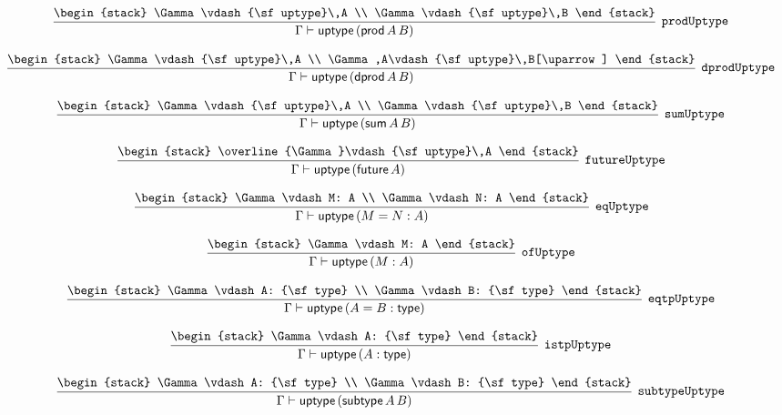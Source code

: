 \[
\infer[{\tt prodUptype}]{\Gamma \vdash {\sf uptype}\,({\sf prod}\,A\,B)}{
\begin{stack}
\Gamma \vdash {\sf uptype}\,A
\\
\Gamma \vdash {\sf uptype}\,B
\end{stack}}
\]

\[
\infer[{\tt dprodUptype}]{\Gamma \vdash {\sf uptype}\,({\sf dprod}\,A\,B)}{
\begin{stack}
\Gamma \vdash {\sf uptype}\,A
\\
\Gamma ,A\vdash {\sf uptype}\,B[\uparrow ]
\end{stack}}
\]

\[
\infer[{\tt sumUptype}]{\Gamma \vdash {\sf uptype}\,({\sf sum}\,A\,B)}{
\begin{stack}
\Gamma \vdash {\sf uptype}\,A
\\
\Gamma \vdash {\sf uptype}\,B
\end{stack}}
\]

\[
\infer[{\tt futureUptype}]{\Gamma \vdash {\sf uptype}\,({\sf future}\,A)}{
\begin{stack}
\overline{\Gamma}\vdash {\sf uptype}\,A
\end{stack}}
\]

\[
\infer[{\tt eqUptype}]{\Gamma \vdash {\sf uptype}\,(M= N: A)}{
\begin{stack}
\Gamma \vdash M: A
\\
\Gamma \vdash N: A
\end{stack}}
\]

\[
\infer[{\tt ofUptype}]{\Gamma \vdash {\sf uptype}\,(M: A)}{
\begin{stack}
\Gamma \vdash M: A
\end{stack}}
\]

\[
\infer[{\tt eqtpUptype}]{\Gamma \vdash {\sf uptype}\,(A= B: {\sf type})}{
\begin{stack}
\Gamma \vdash A: {\sf type}
\\
\Gamma \vdash B: {\sf type}
\end{stack}}
\]

\[
\infer[{\tt istpUptype}]{\Gamma \vdash {\sf uptype}\,(A: {\sf type})}{
\begin{stack}
\Gamma \vdash A: {\sf type}
\end{stack}}
\]

\[
\infer[{\tt subtypeUptype}]{\Gamma \vdash {\sf uptype}\,({\sf subtype}\,A\,B)}{
\begin{stack}
\Gamma \vdash A: {\sf type}
\\
\Gamma \vdash B: {\sf type}
\end{stack}}
\]

